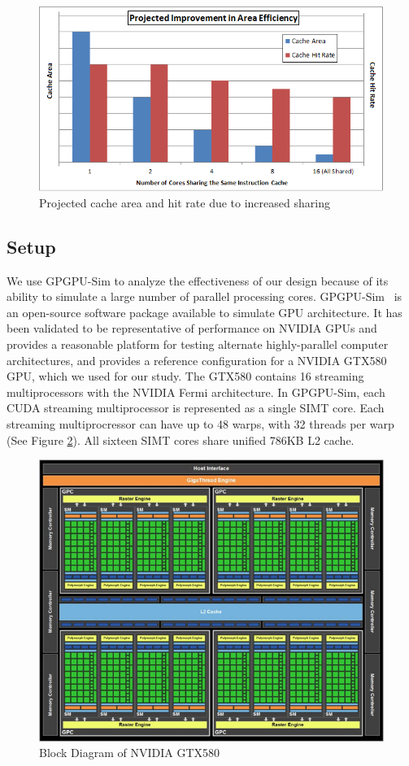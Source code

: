 \begin{figure}
\centering
\includegraphics[width=\columnwidth]{graphics/AreaEff.png}
\caption{Projected cache area and hit rate due to increased sharing}
\label{AreaEff}
\end{figure}

\subsection{Setup}

We use GPGPU-Sim to analyze the effectiveness of our design because of
its ability to simulate a large number of parallel processing cores.
GPGPU-Sim~\cite{bakhodayuan09} is an open-source software package
available to simulate GPU architecture. 
It has been validated to be representative of performance on NVIDIA
GPUs and provides a reasonable platform for testing alternate
highly-parallel computer architectures, and provides a reference
configuration for a NVIDIA GTX580 GPU, which we used for our study.
The GTX580 contains 16 streaming multiprocessors with the NVIDIA Fermi
architecture. 
In GPGPU-Sim, each CUDA streaming multiprocessor is represented as a
single SIMT core. 
Each streaming multiprocressor can have up to 48 warps, with 32
threads per warp (See Figure \ref{GTX580}). 
All sixteen SIMT cores share unified 786KB L2 cache. 

\begin{figure}[b]
\centering
\includegraphics[width=\columnwidth]{graphics/GTX580.jpg}
\caption{Block Diagram of NVIDIA GTX580~\cite{gf100}}
\label{GTX580}
\end{figure}

